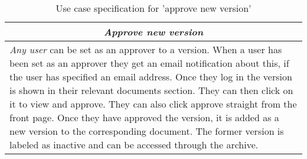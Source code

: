 \begin{table}[H]
\centering
\begin{tabular}{p{14.5cm}}
\hline
\multicolumn{1}{c}{\textit{\textbf{Approve new version}}} \\
\hline
\textit{Any user} can be set as an approver to a version.
When a user has been set as an approver they get an email notification about this, if the user has specified an email address.
Once they log in the version is shown in their relevant documents section.
They can then click on it to view and approve.
They can also click approve straight from the front page.
Once they have approved the version, it is added as a new version to the corresponding document.
The former version is labeled as inactive and can be accessed through the archive.
\\\hline
\end{tabular}
\caption{Use case specification for 'approve new version'}\label{tab:approve}
\end{table}
